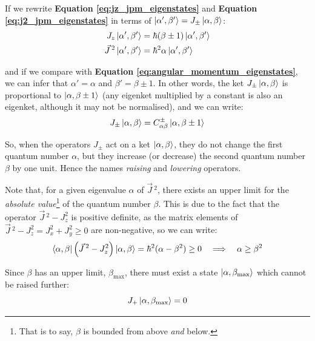 If we rewrite \textbf{Equation \ref{eq:jz_jpm_eigenstates}} and \textbf{Equation \ref{eq:j2_jpm_eigenstates}} in terms of $\ket{\alpha',\beta'} = J_\pm \ket{\alpha,\beta}$:
\begin{equation}
    \begin{split}
        J_z\ket{\alpha', \beta'} &= \hbar(\beta \pm 1)\ket{\alpha', \beta'} \\
        \vec{J}\,^2\ket{\alpha', \beta'} &= \hbar^2\alpha\ket{\alpha', \beta'}
    \end{split}
\end{equation}

and if we compare with \textbf{Equation \ref{eq:angular_momentum_eigenstates}}, we can infer that $\alpha' = \alpha$ and $\beta' = \beta \pm 1$. In other words, the ket $J_\pm\ket{\alpha,\beta}$ is proportional to $\ket{\alpha, \beta\pm 1}$ (any eigenket multiplied by a constant is also an eigenket, although it may not be normalised), and we can write:
\begin{equation} \label{eq:j_p_and_j_m_eigenstates}
    J_\pm\ket{\alpha, \beta} = C_{\alpha\beta}^\pm\ket{\alpha, \beta\pm 1}
\end{equation}

So, when the operators $J_\pm$ act on a ket $\ket{\alpha, \beta}$, they do not change the first quantum number $\alpha$, but they increase (or decrease) the second quantum number $\beta$ by one unit. Hence the names \textit{raising} and \textit{lowering} operators.

Note that, for a given eigenvalue $\alpha$ of $\vec{J}\,^2$, there exists an upper limit for the \textit{absolute value}\footnote{That is to say, $\beta$ is bounded from above \textit{and} below.} of the quantum number $\beta$. This is due to the fact that the operator $\vec{J}\,^2 - J_z^2$ is positive definite, as the matrix elements of $\vec{J}\,^2 - J_z^2 = J_x^2 + J_y^2 \geq 0$ are non-negative, so we can write:
\begin{equation}
    \braket{\alpha, \beta|\left( \vec{J}\,^2 - J_z^2 \right)| \alpha, \beta} = \hbar^2(\alpha - \beta^2) \geq 0\quad \Longrightarrow\quad \alpha \geq\beta^2
\end{equation} 

Since $\beta$ has an upper limit, $\beta_\text{max}$, there must exist a state $\ket{\alpha, \beta_\text{max}}$ which cannot be raised further:
\begin{equation}
    J_+\ket{\alpha, \beta_\text{max}} = 0
\end{equation}

